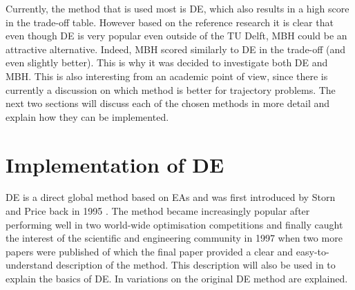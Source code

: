 Currently, the method that is used most is \ac{DE}, which also results in a high score in the trade-off table. However based on the reference research it is clear that even though \ac{DE} is very popular even outside of the TU Delft, \ac{MBH} could be an attractive alternative. Indeed, \ac{MBH} scored similarly to \ac{DE} in the trade-off (and even slightly better). This is why it was decided to investigate both \ac{DE} and \ac{MBH}. This is also interesting from an academic point of view, since there is currently a discussion on which method is better for trajectory problems. The next two sections will discuss each of the chosen methods in more detail and explain how they can be implemented.

\section{Implementation of \ac{DE}}
\label{sec:impde}
\acl{DE} is a direct global method based on \ac{EA}s and was first introduced by Storn and Price back in 1995 \cite{storn1995differential}. The method became increasingly popular after performing well in two world-wide optimisation competitions \cite{price2005differential} and finally caught the interest of the scientific and engineering community in 1997 when two more papers were published of which the final paper \cite{storn1997differential} provided a clear and easy-to-understand description of the method. This description will also be used in  to explain the basics of \ac{DE}. In  variations on the original \ac{DE} method are explained.


